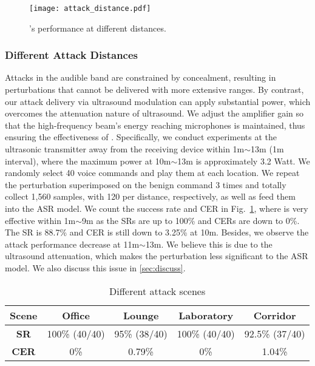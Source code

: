 \begin{figure}[t]
    \centering
    \texttt{[image: attack\_distance.pdf]}
    \caption{\alias's performance at different distances.}
    \label{fig:attack_distance}
    \vspace{-10pt}
\end{figure}
\subsubsection{Different Attack Distances}
Attacks in the audible band are constrained by concealment, resulting in perturbations that cannot be delivered with more extensive ranges. By contrast, our attack delivery via ultrasound modulation can apply substantial power, which overcomes the attenuation nature of ultrasound. We adjust the amplifier gain so that the high-frequency beam's energy reaching microphones is maintained, thus ensuring the effectiveness of \alias. Specifically, we conduct experiments at the ultrasonic transmitter away from the receiving device within 1m$\sim$13m (1m interval), where the maximum power at 10m$\sim$13m is approximately 3.2 Watt. We randomly select 40 voice commands and play them at each location. We repeat the perturbation superimposed on the benign command 3 times and totally collect 1,560 samples, with 120 per distance, respectively, as well as feed them into the ASR model. We count the success rate and CER in Fig.~\ref{fig:attack_distance}, where \alias is very effective within 1m$\sim$9m as the SRs are up to 100\% and CERs are down to 0\%. The SR is 88.7\% and CER is still down to 3.25\% at 10m. Besides, we observe the attack performance decrease at 11m$\sim$13m. We believe this is due to the ultrasound attenuation, which makes the perturbation less significant to the ASR model. We also discuss this issue in \textsection\ref{sec:discuss}.

\begin{table}[t]\footnotesize
	\centering
		\caption{Different attack scenes}
		\renewcommand\arraystretch{0.7}
		\renewcommand\tabcolsep{3pt}
		\begin{threeparttable}
			\begin{tabular}{c|c|c|c|c}
				\toprule
				\textbf{Scene} & \textbf{Office} & \textbf{Lounge} & \textbf{Laboratory} & \textbf{Corridor} \\
				\midrule
				\textbf{SR} & 100\% (40/40) & 95\% (38/40) & 100\% (40/40) & 92.5\% (37/40) \\ \midrule
				\textbf{CER} & 0\% & 0.79\% & 0\% & 1.04\% \\
				\bottomrule
			\end{tabular}
		\end{threeparttable}
		\label{tab:diff_scene}
\end{table}

